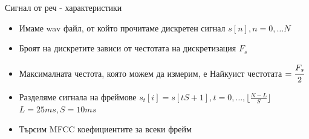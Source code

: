 \documentclass[9pt]{beamer}
\begin{document}
    \begin{frame}[t]{Сигнал от реч - характеристики}
        \begin{itemize}
            \setlength\itemsep{\fill}
            \pause
            \item Имаме wav файл, от който прочитаме дискретен сигнал $s[n], n = 0,\ldots N$
            \pause
            \item Броят на дискретите зависи от честотата на дискретизация $F_s$
            \pause
            \item Максималната честота, която можем да измерим, е Найкуист честотата $= \cfrac{F_s}{2}$ 
            \pause
            \item Разделяме сигнала на фреймове $s_t[i] = s[tS + 1], t = 0,\ldots, \lfloor \frac{N-L}{S} \rfloor$ 
            \pause $L = 25 ms, S = 10 ms$ 
            \pause
            \item Търсим MFCC коефициентите за всеки фрейм
        \end{itemize}
    \end{frame}
\end{document}
